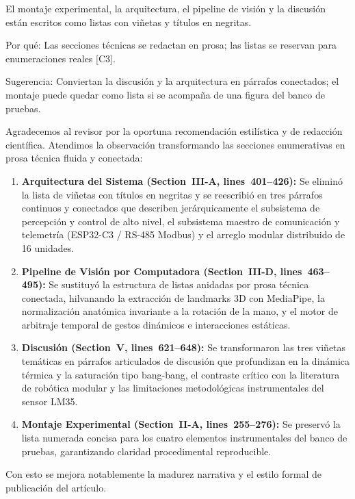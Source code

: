 \documentclass{LabDSTresponse}
\begin{document}
{El montaje experimental, la arquitectura, el pipeline de visión y la discusión están escritos como listas con viñetas y títulos en negritas.

Por qué: Las secciones técnicas se redactan en prosa; las listas se reservan para enumeraciones reales [C3].

Sugerencia: Conviertan la discusión y la arquitectura en párrafos conectados; el montaje puede quedar como lista si se acompaña de una figura del banco de pruebas.}
{Agradecemos al revisor por la oportuna recomendación estilística y de redacción científica. Atendimos la observación transformando las secciones enumerativas en prosa técnica fluida y conectada:
\begin{enumerate}
    \item \textbf{Arquitectura del Sistema (Section~III-A, lines~401--426):} Se eliminó la lista de viñetas con títulos en negritas y se reescribió en tres párrafos continuos y conectados que describen jerárquicamente el subsistema de percepción y control de alto nivel, el subsistema maestro de comunicación y telemetría (ESP32-C3 / RS-485 Modbus) y el arreglo modular distribuido de 16 unidades.
    \item \textbf{Pipeline de Visión por Computadora (Section~III-D, lines~463--495):} Se sustituyó la estructura de listas anidadas por prosa técnica conectada, hilvanando la extracción de landmarks 3D con MediaPipe, la normalización anatómica invariante a la rotación de la mano, y el motor de arbitraje temporal de gestos dinámicos e interacciones estáticas.
    \item \textbf{Discusión (Section~V, lines~621--648):} Se transformaron las tres viñetas temáticas en párrafos articulados de discusión que profundizan en la dinámica térmica y la saturación tipo bang-bang, el contraste crítico con la literatura de robótica modular y las limitaciones metodológicas instrumentales del sensor LM35.
    \item \textbf{Montaje Experimental (Section~II-A, lines~255--276):} Se preservó la lista numerada concisa para los cuatro elementos instrumentales del banco de pruebas, garantizando claridad procedimental reproducible.
\end{enumerate}
Con esto se mejora notablemente la madurez narrativa y el estilo formal de publicación del artículo.}
\end{document}
